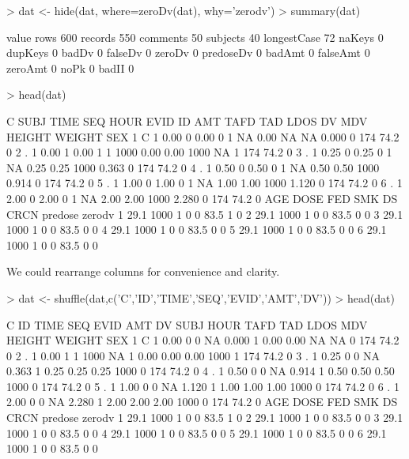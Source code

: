 \begin{Schunk}
\begin{Sinput}
> dat <- hide(dat, where=zeroDv(dat), why='zerodv')
> summary(dat)
\end{Sinput}
\begin{Soutput}
            value
rows          600
records       550
comments       50
subjects       40
longestCase    72
naKeys          0
dupKeys         0
badDv           0
falseDv         0
zeroDv          0
predoseDv       0
badAmt          0
falseAmt        0
zeroAmt         0
noPk            0
badII           0
\end{Soutput}
\begin{Sinput}
> head(dat)
\end{Sinput}
\begin{Soutput}
  C SUBJ TIME SEQ HOUR EVID ID  AMT TAFD  TAD LDOS    DV MDV HEIGHT WEIGHT SEX
1 C    1 0.00   0 0.00    0  1   NA 0.00   NA   NA 0.000   0    174   74.2   0
2 .    1 0.00   1 0.00    1  1 1000 0.00 0.00 1000    NA   1    174   74.2   0
3 .    1 0.25   0 0.25    0  1   NA 0.25 0.25 1000 0.363   0    174   74.2   0
4 .    1 0.50   0 0.50    0  1   NA 0.50 0.50 1000 0.914   0    174   74.2   0
5 .    1 1.00   0 1.00    0  1   NA 1.00 1.00 1000 1.120   0    174   74.2   0
6 .    1 2.00   0 2.00    0  1   NA 2.00 2.00 1000 2.280   0    174   74.2   0
   AGE DOSE FED SMK DS CRCN predose zerodv
1 29.1 1000   1   0  0 83.5       1      0
2 29.1 1000   1   0  0 83.5       0      0
3 29.1 1000   1   0  0 83.5       0      0
4 29.1 1000   1   0  0 83.5       0      0
5 29.1 1000   1   0  0 83.5       0      0
6 29.1 1000   1   0  0 83.5       0      0
\end{Soutput}
\end{Schunk}
We could rearrange columns for convenience and clarity.
\begin{Schunk}
\begin{Sinput}
> dat <- shuffle(dat,c('C','ID','TIME','SEQ','EVID','AMT','DV'))
> head(dat)
\end{Sinput}
\begin{Soutput}
  C ID TIME SEQ EVID  AMT    DV SUBJ HOUR TAFD  TAD LDOS MDV HEIGHT WEIGHT SEX
1 C  1 0.00   0    0   NA 0.000    1 0.00 0.00   NA   NA   0    174   74.2   0
2 .  1 0.00   1    1 1000    NA    1 0.00 0.00 0.00 1000   1    174   74.2   0
3 .  1 0.25   0    0   NA 0.363    1 0.25 0.25 0.25 1000   0    174   74.2   0
4 .  1 0.50   0    0   NA 0.914    1 0.50 0.50 0.50 1000   0    174   74.2   0
5 .  1 1.00   0    0   NA 1.120    1 1.00 1.00 1.00 1000   0    174   74.2   0
6 .  1 2.00   0    0   NA 2.280    1 2.00 2.00 2.00 1000   0    174   74.2   0
   AGE DOSE FED SMK DS CRCN predose zerodv
1 29.1 1000   1   0  0 83.5       1      0
2 29.1 1000   1   0  0 83.5       0      0
3 29.1 1000   1   0  0 83.5       0      0
4 29.1 1000   1   0  0 83.5       0      0
5 29.1 1000   1   0  0 83.5       0      0
6 29.1 1000   1   0  0 83.5       0      0
\end{Soutput}
\end{Schunk}

